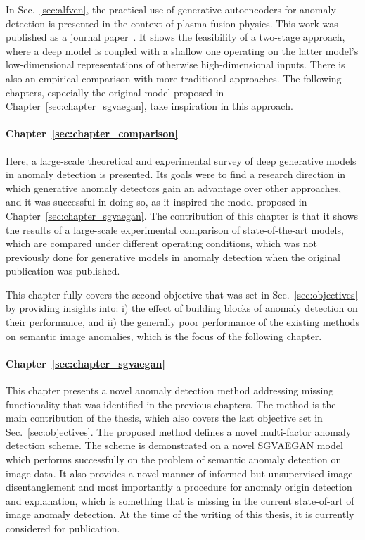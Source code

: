 In Sec.~\ref{sec:alfven}, the practical use of generative autoencoders for anomaly detection is presented in the context of plasma fusion physics. This work was published as a journal paper~\cite{vskvara2020detection}. It shows the feasibility of a two-stage approach, where a deep model is coupled with a shallow one operating on the latter model's low-dimensional representations of otherwise high-dimensional inputs. There is also an empirical comparison with more traditional approaches. The following chapters, especially the original model proposed in Chapter~\ref{sec:chapter_sgvaegan}, take inspiration in this approach.

\paragraph{Chapter~\ref{sec:chapter_comparison}} Here, a large-scale theoretical and experimental survey of deep generative models in anomaly detection is presented. Its goals were to find a research direction in which generative anomaly detectors gain an advantage over other approaches, and it was successful in doing so, as it inspired the model proposed in Chapter~\ref{sec:chapter_sgvaegan}. The contribution of this chapter is that it shows the results of a large-scale experimental comparison of state-of-the-art models, which are compared under different operating conditions, which was not previously done for generative models in anomaly detection when the original publication \cite{vskvara2021comparison} was published.

This chapter fully covers the second objective that was set in Sec.~\ref{sec:objectives} by providing insights into: i) the effect of building blocks of anomaly detection on their performance, and ii) the generally poor performance of the existing methods on semantic image anomalies, which is the focus of the following chapter.

\paragraph{Chapter~\ref{sec:chapter_sgvaegan}} This chapter presents a novel anomaly detection method addressing missing functionality that was identified in the previous chapters. The method is the main contribution of the thesis, which also covers the last objective set in Sec.~\ref{sec:objectives}. The proposed method defines a novel multi-factor anomaly detection scheme. The scheme is demonstrated on a novel SGVAEGAN model which performs successfully on the problem of semantic anomaly detection on image data. It also provides a novel manner of informed but unsupervised image disentanglement and most importantly a procedure for anomaly origin detection and explanation, which is something that is missing in the current state-of-art of image anomaly detection. At the time of the writing of this thesis, it is currently considered for publication.

